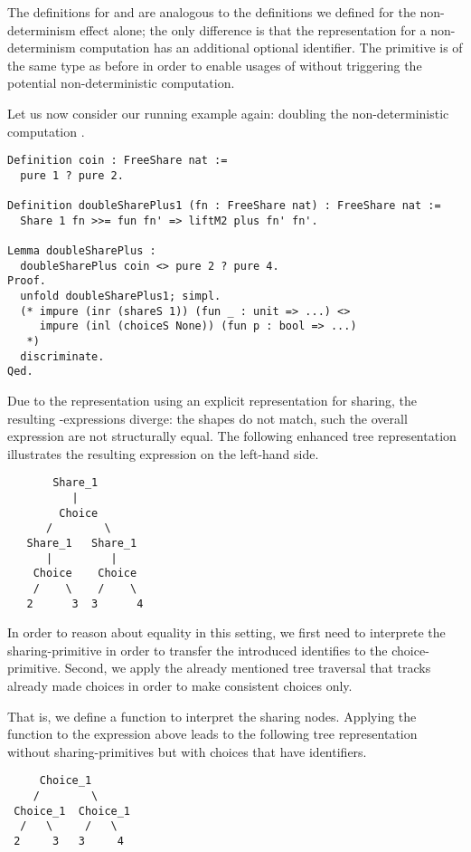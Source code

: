 The definitions for  and  are analogous to the
definitions we defined for the non-determinism effect alone; the only
difference is that the representation for a non-determinism
computation has an additional optional identifier.
The  primitive is of the same type as before in order to
enable usages of \cinl{>>=} without triggering the potential
non-deterministic computation.

Let us now consider our running example again: doubling the
non-deterministic computation .

\begin{verbatim}
Definition coin : FreeShare nat :=
  pure 1 ? pure 2.

Definition doubleSharePlus1 (fn : FreeShare nat) : FreeShare nat :=
  Share 1 fn >>= fun fn' => liftM2 plus fn' fn'.

Lemma doubleSharePlus :
  doubleSharePlus coin <> pure 2 ? pure 4.
Proof.
  unfold doubleSharePlus1; simpl.
  (* impure (inr (shareS 1)) (fun _ : unit => ...) <>
     impure (inl (choiceS None)) (fun p : bool => ...)
   *)
  discriminate.
Qed.
\end{verbatim}

Due to the representation using an explicit representation for
sharing, the resulting -expressions diverge: the shapes do
not match, such the overall expression are not structurally equal.
The following enhanced tree representation illustrates the resulting
expression on the left-hand side.

\begin{verbatim}
       Share_1
          |      
        Choice
      /        \
   Share_1   Share_1
      |         |
    Choice    Choice
    /    \    /    \
   2      3  3      4
\end{verbatim}

In order to reason about equality in this setting, we first need to
interprete the sharing-primitive in order to transfer the introduced
identifies to the choice-primitive.
Second, we apply the already mentioned tree traversal that tracks
already made choices in order to make consistent choices only.

That is, we define a function  to interpret the sharing nodes.
Applying the function to the expression above leads to the following
tree representation without sharing-primitives but with choices that
have identifiers.

\begin{verbatim}
     Choice_1
    /        \
 Choice_1  Choice_1
  /   \     /   \
 2     3   3     4
\end{verbatim}

